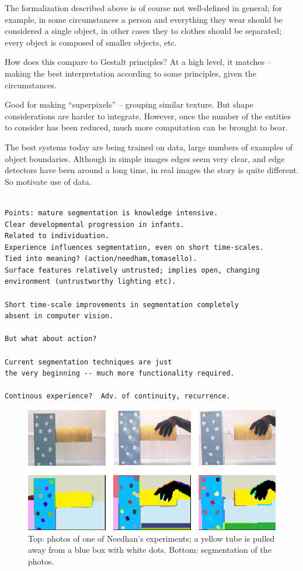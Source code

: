 The formalization described above is of course
not well-defined in general; for example, in some
circumstances a person and everything they wear should be
considered a single object, in other cases they to clothes
should be separated; every object is composed of smaller
objects, etc.  

How does this compare to Gestalt principles?  At a high level, it
matches -- making the best interpretation according to some
principles, given the circumstances.

Good for making ``superpixels'' -- grouping similar texture.
But shape considerations are harder to integrate.  However,
once the number of the entities to consider has been 
reduced, much more computation can be brought to bear.

The best systems today are being trained on data, large numbers
of examples of object boundaries.  Although in simple images
edges seem very clear, and edge detectors have been around
a long time, in real images the story is quite different.
So motivate use of data.




\begin{verbatim}

Points: mature segmentation is knowledge intensive.
Clear developmental progression in infants.
Related to individuation.
Experience influences segmentation, even on short time-scales.
Tied into meaning? (action/needham,tomasello).
Surface features relatively untrusted; implies open, changing 
environment (untrustworthy lighting etc).

Short time-scale improvements in segmentation completely
absent in computer vision.

But what about action?

Current segmentation techniques are just
the very beginning -- much more functionality required.

Continous experience?  Adv. of continuity, recurrence.

\end{verbatim}


\begin{figure}

\centerline{\includegraphics[width=0.5\columnwidth]{fig-pull}}

\caption{
Top: photos of one of Needhan's experiments; a yellow tube is 
pulled away from a blue box with white dots.
Bottom: segmentation of the photos.
}

\label{fig:move-apart}

\end{figure}

